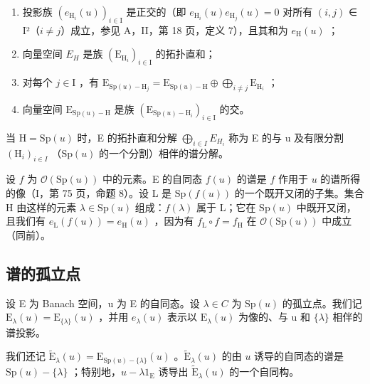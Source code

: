 \begin{enumerate}
\def\labelenumi{\alph{enumi})}
\item
  投影族 \((e_{\mathrm{H}_{i}}(u))_{i\in\mathrm{I}}\) 是正交的（即 \(e_{\mathrm{H}_{i}}(u)e_{\mathrm{H}_{j}}(u)=0\) 对所有 \((i,j)\) ∈ I²（\(i\neq j\)）成立，参见 A，II，第 18 页，定义 7），且其和为 \(e_{\mathrm{H}}(u)\) ；
\item
  向量空间 \(E_{H}\) 是族 \((\mathrm{E}_{\mathrm{H}_{i}})_{i\in\mathrm{I}}\) 的拓扑直和；
\item
  对每个 \(j \in \mathrm{I}\) ，有 \(\mathrm{E}_{\mathrm{Sp}(u) - \mathrm{H}_j} = \mathrm{E}_{\mathrm{Sp}(u) - \mathrm{H}} \oplus \bigoplus_{i \neq j} \mathrm{E}_{\mathrm{H}_i}\) ；
\item
  向量空间 \(\mathrm{E}_{\mathrm{Sp}(u)-\mathrm{H}}\) 是族 \((\mathrm{E}_{\mathrm{Sp}(u)-\mathrm{H}_i})_{i\in\mathrm{I}}\) 的交。
\end{enumerate}

当 \(\mathrm{H} = \mathrm{Sp}(u)\) 时，E 的拓扑直和分解 \(\bigoplus_{i \in I} E_{H_i}\) 称为 E 的与 u 及有限分割 \((\mathrm{H}_i)_{i \in I}\) （\(\mathrm{Sp}(u)\) 的一个分割）相伴的谱分解。

设 \(f\) 为 \(\mathcal{O}(\mathrm{Sp}(u))\) 中的元素。E 的自同态 \(f(u)\) 的谱是 \(f\) 作用于 \(u\) 的谱所得的像（I，第 75 页，命题 8）。设 L 是 \(\mathrm{Sp}(f(u))\) 的一个既开又闭的子集。集合 H 由这样的元素 \(\lambda \in \mathrm{Sp}(u)\) 组成：\(f(\lambda)\) 属于 L；它在 \(\mathrm{Sp}(u)\) 中既开又闭，且我们有 \(e_{\mathrm{L}}(f(u)) = e_{\mathrm{H}}(u)\) ，因为有 \(f_{\mathrm{L}} \circ f = f_{\mathrm{H}}\) 在 \(\mathcal{O}(\mathrm{Sp}(u))\) 中成立（同前）。

\subsection{谱的孤立点}

设 E 为 Banach 空间，u 为 E 的自同态。设 \(\lambda\in C\) 为 \(\mathrm{Sp}(u)\) 的孤立点。我们记 \(\mathrm{E}_{\lambda}(u)=\mathrm{E}_{\{\lambda\}}(u)\) ，并用 \(e_{\lambda}(u)\) 表示以 \(\mathrm{E}_{\lambda}(u)\) 为像的、与 u 和 \(\{\lambda\}\) 相伴的谱投影。

我们还记 \(\widetilde{\mathrm{E}}_{\lambda}(u) = \mathrm{E}_{\mathrm{Sp}(u) - \{\lambda\}}(u)\) 。\(\widetilde{\mathrm{E}}_{\lambda}(u)\) 的由 \(u\) 诱导的自同态的谱是 \(\mathrm{Sp}(u) - \{\lambda\}\) ；特别地，\(u - \lambda 1_{\mathrm{E}}\) 诱导出 \(\widetilde{\mathrm{E}}_{\lambda}(u)\) 的一个自同构。

